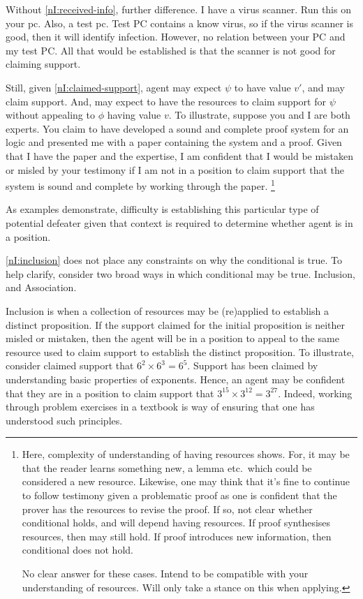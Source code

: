 \begin{note}
{    Without \ref{nI:received-info}, further difference.
    I have a virus scanner.
    Run this on your pc.
    Also, a test pc.
    Test PC contains a know virus, so if the virus scanner is good, then it will identify infection.
    However, no relation between your PC and my test PC.
    All that would be established is that the scanner is not good for claiming support.
    }

  Still, given \ref{nI:claimed-support}, agent may expect \(\psi\) to have value \(v'\), and may claim support.
  And, may expect to have the resources to claim support for \(\psi\) without appealing to \(\phi\) having value \(v\).
  To illustrate, suppose you and I are both experts.
  You claim to have developed a sound and complete proof system for an logic and presented me with a paper containing the system and a proof.
  Given that I have the paper and the expertise, I am confident that I would be mistaken or misled by your testimony if I am not in a position to claim support that the system is sound and complete by working through the paper.\nolinebreak
  \footnote{
    Here, complexity of understanding of having resources shows.
    For, it may be that the reader learns something new, a lemma etc.\ which could be considered a new resource.
    Likewise, one may think that it's fine to continue to follow testimony given a problematic proof as one is confident that the prover has the resources to revise the proof.
    If so, not clear whether conditional holds, and will depend having resources.
    If proof synthesises resources, then may still hold.
    If proof introduces new information, then conditional does not hold.

    No clear answer for these cases.
    Intend to be compatible with your understanding of resources.
    Will only take a stance on this when applying.
  }

  As examples demonstrate, difficulty is establishing this particular type of potential defeater given that context is required to determine whether agent is in a position.

  \ref{nI:inclusion} does not place any constraints on why the conditional is true.
  To help clarify, consider two broad ways in which conditional may be true.
  Inclusion, and Association.

  Inclusion is when a collection of resources may be (re)applied to establish a distinct proposition.
  If the support claimed for the initial proposition is neither misled or mistaken, then the agent will be in a position to appeal to the same resource used to claim support to establish the distinct proposition.
  To illustrate, consider claimed support that \(6^{2} \times 6^{3} = 6^{5}\).
  Support has been claimed by understanding basic properties of exponents.
  Hence, an agent may be confident that they are in a position to claim support that \(3^{15} \times 3^{12} = 3^{27}\).
  Indeed, working through problem exercises in a textbook is way of ensuring that one has understood such principles.


\end{note}

